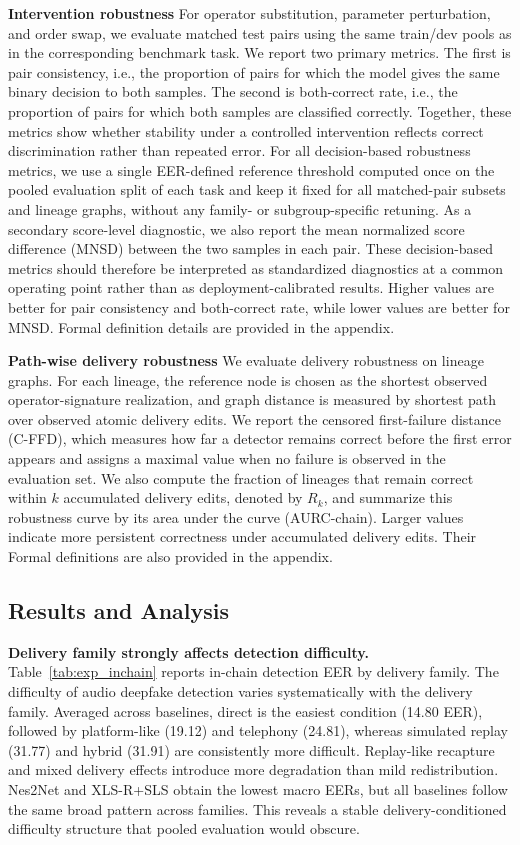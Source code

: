 \noindent\textbf{Intervention robustness}
For operator substitution, parameter perturbation, and order swap, we evaluate matched test pairs using the same train/dev pools as in the corresponding benchmark task. We report two primary metrics. The first is pair consistency, i.e., the proportion of pairs for which the model gives the same binary decision to both samples. The second is both-correct rate, i.e., the proportion of pairs for which both samples are classified correctly. Together, these metrics show whether stability under a controlled intervention reflects correct discrimination rather than repeated error. For all decision-based robustness metrics, we use a single EER-defined reference threshold computed once on the pooled evaluation split of each task and keep it fixed for all matched-pair subsets and lineage graphs, without any family- or subgroup-specific retuning. As a secondary score-level diagnostic, we also report the mean normalized score difference (MNSD) between the two samples in each pair. These decision-based metrics should therefore be interpreted as standardized diagnostics at a common operating point rather than as deployment-calibrated results. Higher values are better for pair consistency and both-correct rate, while lower values are better for MNSD. Formal definition details are provided in the appendix.

\noindent\textbf{Path-wise delivery robustness}
We evaluate delivery robustness on lineage graphs. For each lineage, the reference node is chosen as the shortest observed operator-signature realization, and graph distance is measured by shortest path over observed atomic delivery edits. We report the censored first-failure distance (C-FFD), which measures how far a detector remains correct before the first error appears and assigns a maximal value when no failure is observed in the evaluation set. We also compute the fraction of lineages that remain correct within $k$ accumulated delivery edits, denoted by $R_k$, and summarize this robustness curve by its area under the curve (AURC-chain). Larger values indicate more persistent correctness under accumulated delivery edits. Their Formal definitions are also provided in the appendix.


\subsection{Results and Analysis}

\noindent\textbf{Delivery family strongly affects detection difficulty.}
Table~\ref{tab:exp_inchain} reports in-chain detection EER by delivery family. The difficulty of audio deepfake detection varies systematically with the delivery family. Averaged across baselines, direct is the easiest condition (14.80 EER), followed by platform-like (19.12) and telephony (24.81), whereas simulated replay (31.77) and hybrid (31.91) are consistently more difficult. Replay-like recapture and mixed delivery effects introduce more degradation than mild redistribution. Nes2Net and XLS-R+SLS obtain the lowest macro EERs, but all baselines follow the same broad pattern across families. This reveals a stable delivery-conditioned difficulty structure that pooled evaluation would obscure.

